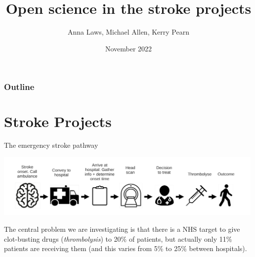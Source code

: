 \documentclass[xcolor={usenames,dvipsnames}]{beamer}
\title{Open science in the stroke projects}
\author{Anna Laws, Michael Allen, Kerry Pearn}
\date{November 2022}
\begin{document}

\begin{frame}
\titlepage

\end{frame}


\begin{frame}
\frametitle{Outline}
\tableofcontents
\end{frame}


\section{Stroke Projects}

\begin{frame}{The emergency stroke pathway}

\begin{center}
\includegraphics[width=0.99\textwidth]{./images/pathway}
\end{center}

\vspace{4mm}
The central problem we are investigating is that there is a NHS target to give clot-busting drugs (\emph{thrombolysis}) to 20\% of patients, but actually only 11\% patients are receiving them (and this varies from 5\% to 25\% between hospitals).

\end{frame}


\end{document}
